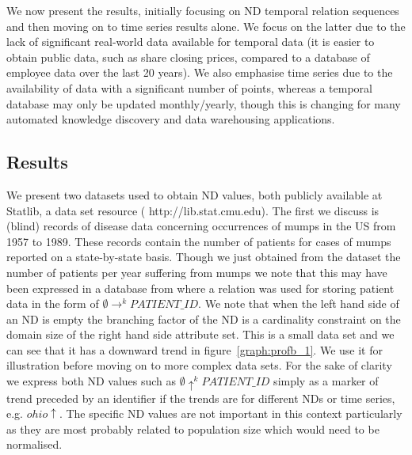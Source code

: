 We now present the results, initially focusing on ND temporal relation
sequences and
then moving on to time series results alone. We focus on the latter
due to the lack of significant real-world data available for temporal
data (it is easier to obtain public data, such as share closing prices,
compared to a database of employee data over the last 20 years). We
also emphasise time series due to the availability of data with a
significant number of points, whereas a temporal database may only be
updated monthly/yearly, though this is changing for many automated
knowledge discovery and data warehousing applications.


\subsection{Results}\label{subsec:tr_relres}


We present two datasets used to obtain ND values, both publicly
available at Statlib, a data set resource (\ttb
http://lib.stat.cmu.edu\tte). The first we
discuss is (blind) records of disease data concerning occurrences of
mumps in the US from 1957 to 1989. These records contain the number of
patients for cases of mumps reported on a state-by-state
basis. Though we just obtained from the dataset the number of patients
per year suffering from mumps we note that this may have been
expressed in a database from where a relation was used for storing
patient data in the form of $\emptyset \to^k PATIENT\_ID$. We note
that when the left hand side of an ND is empty the branching factor of
the ND is a cardinality constraint on the domain size of the right
hand side attribute set. This is a small data set and we can see that
it has a downward trend in figure~\ref{graph:profb_1}. We use it for
illustration before moving on to more complex data sets. For the sake
of clarity we express both ND values such as $\emptyset \uparrow^k PATIENT\_ID$
simply as a marker of trend preceded by an identifier if the trends
are for different NDs or time series, e.g. $ohio\uparrow$. The
specific ND values are not important in this context particularly as
they are most probably related to population size which would need to
be normalised.
\medskip


